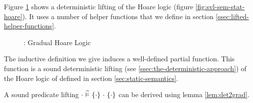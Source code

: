 Figure \ref{fig:gvl-sem-stat-hoare} shows a deterministic lifting of the Hoare logic (figure \ref{fig:svl-sem-stat-hoare}).
It uses a number of helper functions that we define in section \ref{ssec:lifted-helper-functions}.
\begin{figure}[h!]
    
    \caption{\gvl: Gradual Hoare Logic} 
    \label{fig:gvl-sem-stat-hoare}
\end{figure}

\begin{lemma}
    The inductive definition we give induces a well-defined partial function.
    This function is a sound deterministic lifting (see \ref{ssec:the-deterministic-approach}) of the Hoare logic of \svlidf defined in section \ref{sec:static-semantics}.
\end{lemma}

A sound predicate lifting ${\cdot} \,\,\widetilde{\vDash}\,\, \{{\cdot}\} ~{\cdot}~ \{{\cdot}\}$ can be derived using lemma \ref{lem:det2grad}.